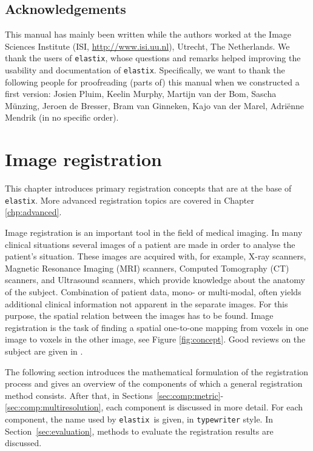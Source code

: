 \documentclass[]{report}
\newcommand{\elastix}{\texttt{elastix}}
\begin{document}
\section{Acknowledgements}

This manual has mainly been written while the authors worked at the Image
Sciences Institute (ISI, \url{http://www.isi.uu.nl}), Utrecht, The Netherlands.
We thank the users of \elastix, whose questions and remarks helped improving
the usability and documentation of \elastix. Specifically, we want to thank the
following people for proofreading (parts of) this manual when we constructed a
first version: Josien Pluim, Keelin Murphy, Martijn van der Bom, Sascha
M\"{u}nzing, Jeroen de Bresser, Bram van Ginneken, Kajo van der Marel,
Adri\"{e}nne Mendrik (in no specific order).


\chapter{Image registration}\label{chp:Registration}

This chapter introduces primary registration concepts that are at
the base of \elastix. More advanced registration topics are covered
in Chapter \ref{chp:advanced}.

Image registration is an important tool in the field of medical
imaging. In many clinical situations several images of a patient
are made in order to analyse the patient's situation. These images
are acquired with, for example, X-ray scanners, Magnetic Resonance
Imaging (MRI) scanners, Computed Tomography (CT) scanners, and
Ultrasound scanners, which provide knowledge about the anatomy of
the subject. Combination of patient data, mono- or multi-modal,
often yields additional clinical information not apparent in the
separate images. For this purpose, the spatial relation between
the images has to be found. Image registration is the task of
finding a spatial one-to-one mapping from voxels in one image to
voxels in the other image, see Figure \ref{fig:concept}. Good
reviews on the subject are given in
\citet{MaintzEA98,LesterEA99,HillEA01,Hajnal01,Zit03:Image,
Modersitzki04:Numerical}.

The following section introduces the mathematical formulation of
the registration process and gives an overview of the components
of which a general registration method consists. After that, in
Sections~\ref{sec:comp:metric}-\ref{sec:comp:multiresolution},
each component is discussed in more detail. For each component,
the name used by \elastix\ is given, in \texttt{typewriter} style.
In Section~\ref{sec:evaluation}, methods to evaluate the
registration results are discussed.
\end{document}
